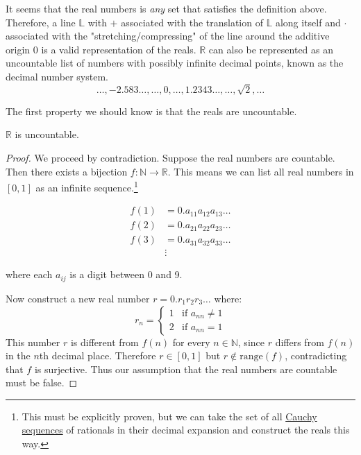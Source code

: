   It seems that the real numbers is \textit{any} set that satisfies the definition above. Therefore, a line $\mathbb{L}$ with $+$ associated with the translation of $\mathbb{L}$ along itself and $\cdot$ associated with the "stretching/compressing" of the line around the additive origin $0$ is a valid representation of the reals. $\mathbb{R}$ can also be represented as an uncountable list of numbers with possibly infinite decimal points, known as the decimal number system. 
  \begin{equation}
    \ldots, -2.583\ldots, \ldots , 0, \ldots, 1.2343\ldots, \ldots, \sqrt{2}, \ldots
  \end{equation}

  The first property we should know is that the reals are uncountable. 

  \begin{theorem}
    \label{thm:cantors-diagonalization}
    $\mathbb{R}$ is uncountable.
  \end{theorem}
  \begin{proof}
    We proceed by contradiction. Suppose the real numbers are countable. Then there exists a bijection $f: \mathbb{N} \to \mathbb{R}$. This means we can list all real numbers in $[0,1]$ as an infinite sequence.\footnote{This must be explicitly proven, but we can take the set of all \hyperref[def:cauchy-sequence]{Cauchy sequences} of rationals in their decimal expansion and construct the reals this way.}
    
    \begin{align}
      f(1) &= 0.a_{11}a_{12}a_{13}\dots \\
      f(2) &= 0.a_{21}a_{22}a_{23}\dots \\
      f(3) &= 0.a_{31}a_{32}a_{33}\dots \\
      &\vdots
    \end{align}
    
    where each $a_{ij}$ is a digit between 0 and 9.
    
    Now construct a new real number $r = 0.r_1r_2r_3\dots$ where:
    \begin{equation}
      r_n = \begin{cases}
        1 & \text{if } a_{nn} \neq 1 \\
        2 & \text{if } a_{nn} = 1
      \end{cases}
    \end{equation}
    This number $r$ is different from $f(n)$ for every $n \in \mathbb{N}$, since $r$ differs from $f(n)$ in the $n$th decimal place. Therefore $r \in [0,1]$ but $r \notin \text{range}(f)$, contradicting that $f$ is surjective. Thus our assumption that the real numbers are countable must be false.
  \end{proof}

